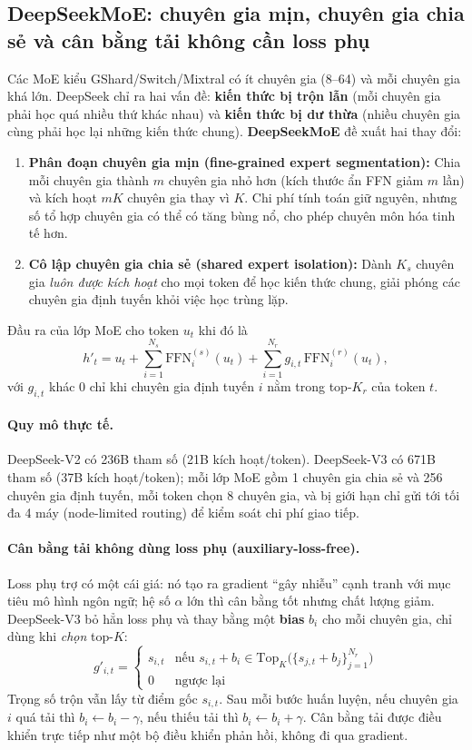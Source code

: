 \subsection{DeepSeekMoE: chuyên gia mịn, chuyên gia chia sẻ và cân bằng tải không cần loss phụ}
\label{ssec:deepseekmoe}
Các MoE kiểu GShard/Switch/Mixtral có ít chuyên gia (8--64) và mỗi chuyên gia khá lớn. DeepSeek chỉ ra hai vấn đề: \textbf{kiến thức bị trộn lẫn} (mỗi chuyên gia phải học quá nhiều thứ khác nhau) và \textbf{kiến thức bị dư thừa} (nhiều chuyên gia cùng phải học lại những kiến thức chung). \textbf{DeepSeekMoE} \cite{dai2024deepseekmoe} đề xuất hai thay đổi:
\begin{enumerate}
	\item \textbf{Phân đoạn chuyên gia mịn (fine-grained expert segmentation):} Chia mỗi chuyên gia thành $m$ chuyên gia nhỏ hơn (kích thước ẩn FFN giảm $m$ lần) và kích hoạt $mK$ chuyên gia thay vì $K$. Chi phí tính toán giữ nguyên, nhưng số tổ hợp chuyên gia có thể có tăng bùng nổ, cho phép chuyên môn hóa tinh tế hơn.
	\item \textbf{Cô lập chuyên gia chia sẻ (shared expert isolation):} Dành $K_s$ chuyên gia \emph{luôn được kích hoạt} cho mọi token để học kiến thức chung, giải phóng các chuyên gia định tuyến khỏi việc học trùng lặp.
\end{enumerate}
Đầu ra của lớp MoE cho token $u_t$ khi đó là
\[
h'_t = u_t + \sum_{i=1}^{N_s} \text{FFN}^{(s)}_i(u_t) + \sum_{i=1}^{N_r} g_{i,t}\,\text{FFN}^{(r)}_i(u_t),
\]
với $g_{i,t}$ khác 0 chỉ khi chuyên gia định tuyến $i$ nằm trong top-$K_r$ của token $t$.

\paragraph{Quy mô thực tế.} DeepSeek-V2 \cite{deepseekai2024v2} có 236B tham số (21B kích hoạt/token). DeepSeek-V3 \cite{deepseekai2024v3} có 671B tham số (37B kích hoạt/token); mỗi lớp MoE gồm 1 chuyên gia chia sẻ và 256 chuyên gia định tuyến, mỗi token chọn 8 chuyên gia, và bị giới hạn chỉ gửi tới tối đa 4 máy (node-limited routing) để kiểm soát chi phí giao tiếp.

\paragraph{Cân bằng tải không dùng loss phụ (auxiliary-loss-free).} Loss phụ trợ có một cái giá: nó tạo ra gradient “gây nhiễu” cạnh tranh với mục tiêu mô hình ngôn ngữ; hệ số $\alpha$ lớn thì cân bằng tốt nhưng chất lượng giảm. DeepSeek-V3 \cite{wang2024auxlossfree, deepseekai2024v3} bỏ hẳn loss phụ và thay bằng một \textbf{bias} $b_i$ cho mỗi chuyên gia, chỉ dùng khi \emph{chọn} top-$K$:
\[
g'_{i,t} = \begin{cases} s_{i,t} & \text{nếu } s_{i,t} + b_i \in \text{Top}_K\big(\{s_{j,t} + b_j\}_{j=1}^{N_r}\big) \\ 0 & \text{ngược lại}\end{cases}
\]
Trọng số trộn vẫn lấy từ điểm gốc $s_{i,t}$. Sau mỗi bước huấn luyện, nếu chuyên gia $i$ quá tải thì $b_i \leftarrow b_i - \gamma$, nếu thiếu tải thì $b_i \leftarrow b_i + \gamma$. Cân bằng tải được điều khiển trực tiếp như một bộ điều khiển phản hồi, không đi qua gradient.

